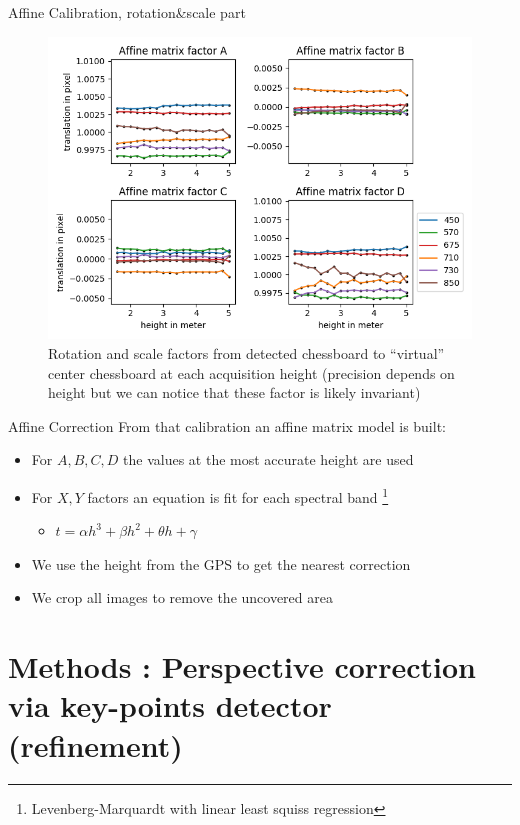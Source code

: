 \documentclass{beamer}
\begin{document}
		\begin{frame}{Affine Calibration, rotation\&scale part}
			\begin{figure}
				\includegraphics[width=0.7\linewidth]{../figures/affine-rotation-height.png}
				\caption{Rotation and scale factors from detected chessboard to ``virtual'' center chessboard at each acquisition height (precision depends on height but we can notice that these factor is likely invariant)}
			\end{figure}
		\end{frame}
	
		\begin{frame}{Affine Correction}
			From that calibration an affine matrix model is built:
			
			\begin{itemize}
				\item For $A,B,C,D$ the values at the most accurate height are used
				\item For $X,Y$ factors an equation is fit for each spectral band \footnote{Levenberg-Marquardt with linear least squiss regression}
				\begin{itemize}
					\item $t = \alpha h^3 + \beta h^2 + \theta h + \gamma$
				\end{itemize}
				\item We use the height from the GPS to get the nearest correction
				\item We crop all images to remove the uncovered area
			\end{itemize}
		
		\end{frame}
	
	\section{Methods : Perspective correction via key-points detector (refinement)}
	
\end{document}
